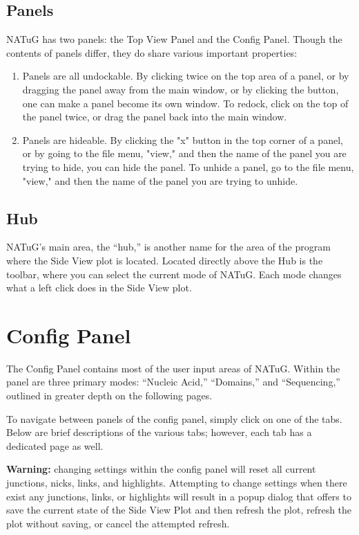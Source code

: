 \documentclass[titlepage]{article}
\begin{document}
	\subsection{Panels} \label{sect:panels}
	NATuG has two panels: the Top View Panel and the Config Panel. Though the contents of panels differ, they do share various important properties:
	
	\begin{enumerate}
		\item Panels are all undockable. By clicking twice on the top area of a panel, or by dragging the panel away from the main window, or by clicking the  button, one can make a panel become its own window. To redock, click on the top of the panel twice, or drag the panel back into the main window. 
		\item Panels are hideable. By clicking the "x" button in the top corner of a panel, or by going to the file menu, "view," and then the name of the panel you are trying to hide, you can hide the panel. To unhide a panel, go to the file menu, "view," and then the name of the panel you are trying to unhide. 
	\end{enumerate}

	\subsection{Hub}
	NATuG’s main area, the “hub,” is another name for the area of the program where the Side View plot is located. Located directly above the Hub is the toolbar, where you can select the current mode of NATuG. Each mode changes what a left click does in the Side View plot.
	
	\section{Config Panel} \label{section:config-panel}
	The Config Panel contains most of the user input areas of NATuG. Within the panel are three primary modes: “Nucleic Acid,” “Domains,” and “Sequencing,” outlined in greater depth on the following pages. 
	
	To navigate between panels of the config panel, simply click on one of the tabs. Below are brief descriptions of the various tabs; however, each tab has a dedicated page as well.
	
	\textbf{Warning:} changing settings within the config panel will reset all current junctions, nicks, links, and highlights. Attempting to change settings when there exist any junctions, links, or highlights will result in a popup dialog that offers to save the current state of the Side View Plot and then refresh the plot, refresh the plot without saving, or cancel the attempted refresh.
	
\end{document}
